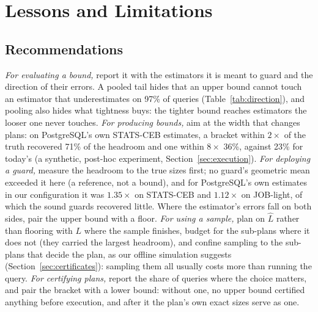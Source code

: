 \documentclass[sigconf, nonacm]{acmart}
\begin{document}
\section{Lessons and Limitations}
\label{sec:lessons}

\subsection{Recommendations}
\emph{For evaluating a bound,} report it with the estimators it is meant to
guard and the direction of their errors. A pooled tail hides that an upper
bound cannot touch an estimator that underestimates on 97\% of queries
(Table~\ref{tab:direction}), and pooling also hides what tightness buys: the
tighter bound reaches estimators the looser one never touches. \emph{For
producing bounds,} aim at the width that changes plans: on PostgreSQL's own
STATS-CEB estimates, a bracket within $2\times$ of the truth recovered 71\% of
the headroom and one within $8\times$ 36\%, against 23\% for today's (a
synthetic, post-hoc experiment, Section~\ref{sec:execution}).
\emph{For deploying a guard,} measure the headroom to the true sizes first; no
guard's geometric mean exceeded it here (a reference, not a bound), and for PostgreSQL's own
estimates in our configuration it was $1.35\times$ on STATS-CEB and
$1.12\times$ on JOB-light, of which the sound guards recovered little. Where the estimator's
errors fall on both sides, pair the upper bound with a floor.
\emph{For using a sample,} plan on $\hat L$ rather than flooring with $L$ where
the sample finishes, budget for the sub-plans where it does not (they carried
the largest headroom), and confine sampling to the sub-plans that decide the
plan, as our offline simulation suggests (Section~\ref{sec:certificates}):
sampling them all usually costs more than running the query.
\emph{For certifying plans,} report the share of queries where the choice
matters, and pair the bracket with a lower bound: without one, no upper bound
certified anything before execution, and after it the plan's own exact sizes
serve as one.
\end{document}
